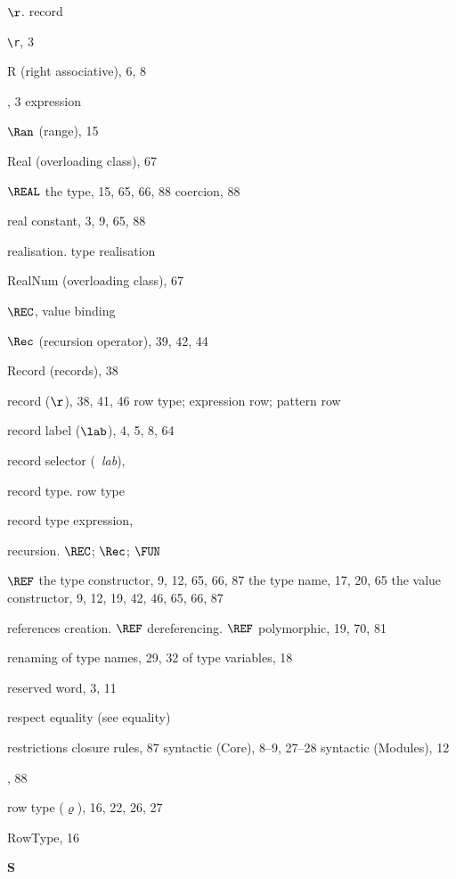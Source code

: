 \begin{theindex}
\item $\r$. \see record
\item \verb+\r+, 3
\item R (right associative), 6, 8
\item \RAISE, 3
\subitem \seealso expression
\item $\Ran$ (range), 15
\item Real (overloading class), 67
\item $\REAL$
\subitem the type, 15, 65, 66, 88
\subitem coercion, 88
\item real constant, 3, 9, 65, 88
\item realisation. \see type realisation
\item RealNum (overloading class), 67
\item $\REC$, \recrefs
\subitem \seealso value binding
\item $\Rec$ (recursion operator), 39, 42, 44
\item Record (records), 38
\item record ($\r$), 38, 41, 46
\subitem \seealso row type; expression row; pattern row
\item record label ($\lab$), 4, 5, 8, 64
\item record selector (\ml{\#}\ {\it lab}), \hashrefs
\item record type. \see row type
\item record type expression, \bracestyexprefs
\item recursion. \see $\REC$; $\Rec$; $\FUN$
\item $\REF$
\subitem the type constructor, 9, 12, 65, 66, 87
\subitem the type name, 17, 20, 65
\subitem the value constructor, 9, 12, 19, 42, 46, 65, 66, 87
\item references
\subitem creation. \see $\REF$
\subitem dereferencing. \see $\REF$
\subitem polymorphic, 19, 70, 81
\item renaming
\subitem of type names, 29, 32
\subitem of type variables, 18
\item reserved word, 3, 11
\item respect equality (see equality)
\item restrictions
\subitem closure rules, 87
\subitem syntactic (Core), 8--9, 27--28
\subitem syntactic (Modules), 12
\item {}, 88
\item row type ($\varrho$), 16, 22, 26, 27
\item RowType, 16
\indexspace

\parbox{64mm}{\hfil{\large\bf S}\hfil}


\end{theindex}
